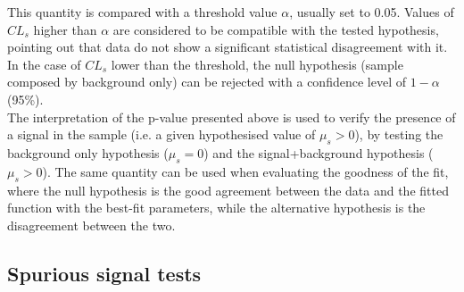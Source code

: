 \noindent This quantity is compared with a threshold value $\alpha$, usually set to 0.05.
Values of $CL_s$ higher than $\alpha$ are considered to be compatible with the tested hypothesis, pointing out that data do not show a significant statistical disagreement with it.
In the case of $CL_s$ lower than the threshold, the null hypothesis (sample composed by background only) can be rejected with a confidence level of $1-\alpha$ (95\%).\\
The interpretation of the p-value presented above is used to verify the presence of a signal in the sample (i.e. a given hypothesised value of $\mu_s>0$), by testing the background only hypothesis ($\mu_s=0$) and the signal+background hypothesis ($\mu_s>0$).
The same quantity can be used when evaluating the goodness of the fit, where the null hypothesis is the good agreement between the data and the fitted function with the best-fit parameters, while the alternative hypothesis is the disagreement between the two.\\
\subsection{Spurious signal tests}\label{sec:ADJJ/Validation/SPT}

